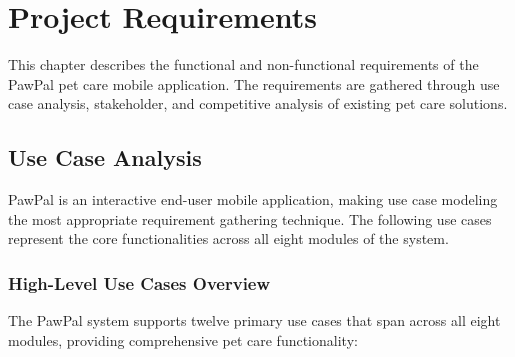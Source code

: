 \chapter{Project Requirements}
This chapter describes the functional and non-functional requirements of the PawPal pet care mobile application. The requirements are gathered through use case analysis, stakeholder, and competitive analysis of existing pet care solutions.

\section{Use Case Analysis}
PawPal is an interactive end-user mobile application, making use case modeling the most appropriate requirement gathering technique. The following use cases represent the core functionalities across all eight modules of the system.

\subsection{High-Level Use Cases Overview}

The PawPal system supports twelve primary use cases that span across all eight modules, providing comprehensive pet care functionality:

